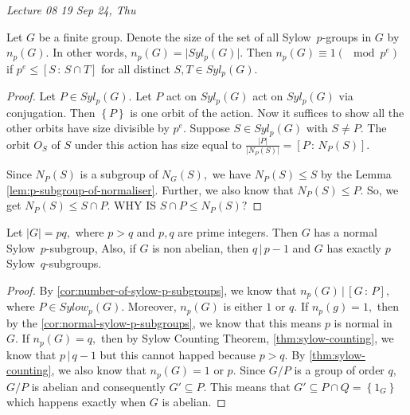 \noindent
\emph{Lecture 08 \hfill 19 Sep 24, Thu}

\begin{theorem}\label{thm:sylow-counting}
Let $G$ be a finite group. Denote the size of the set of all Sylow~$p$\nobreakdash-groups
in $G$ by $n_p(G).$ In other words, $n_p(G) =  \lvert Syl_p(G) \rvert.$ Then $ n_p(G) \equiv
1 (\mod p^e) $ if $ p^e \leq \left[ S \, : \, S \cap T \right] $ for all distinct $ S,T
\in Syl_p(G). $
\end{theorem}

\begin{proof}
	Let $P \in Syl_p(G) .$ Let $P$ act on $Syl_p(G)$ act on $Syl_p(G)$ via 
	conjugation. Then $ \left\{ P \right\} $ is one orbit of the action.
	Now it suffices to show all the other orbits have size divisible by $p^e.$
	Suppose $S \in Syl_p(G) $ with $S \not = P.$ The orbit $O_S$ of $S$ under this action
	has size equal to $ \frac{ \lvert P \rvert}{ \lvert N_P(S) \rvert}  = \left[ P
	\, : \, N_P(S) \right] .$

	Since $N_P(S) $ is a subgroup of $N_G(S),$ we have $N_P(S) \leq S $ by the
	Lemma \ref{lem:p-subgroup-of-normaliser}. Further, we also know that $ N_P(S) 
	\leq P. $ So, we get $N_P(S) \leq S \cap P.$ WHY IS $ S \cap P \leq N_P(S) ? $

\end{proof}

\begin{theorem}
	Let $ \lvert G \rvert = pq, $ where $p > q$ and $p, q$ are prime integers.
	Then $G$ has a normal Sylow~$p$\nobreakdash-subgroup, Also, if $G$ is non abelian,
	then $q \, | \, p-1 $ and $G$ has exactly $p$ Sylow~$q$\nobreakdash-subgroups.	
\end{theorem}

\begin{proof}
	By \cref{cor:number-of-sylow-p-subgroups}, we know that $n_p(G) \, | \, \left[ G
	\, : \, P\right] ,$ where $P \in Sylow_p(G).$ Moreover, $n_p(G)$ is either $1$
	or $q.$ If $n_p(g) = 1,$ then by the \cref{cor:normal-sylow-p-subgroups}, we
	know that this means $p$ is normal in $G.$ If $n_p(G) = q,$ then by Sylow Counting
	Theorem, \cref{thm:sylow-counting}, we know that $p \, | \, q-1$ but this cannot
	happed because $ p > q.$ By \cref{thm:sylow-counting}, we also know that
	$n_p(G) = 1$ or $p.$ Since $ G / P$ is a group of order $q,$ $G / P$ is abelian and
	consequently $G ' \subseteq P.$ This means that $ G' \subseteq P \cap Q = \left\{ 
	1_G \right\} $ which happens exactly when $ G$ is abelian.
\end{proof}

